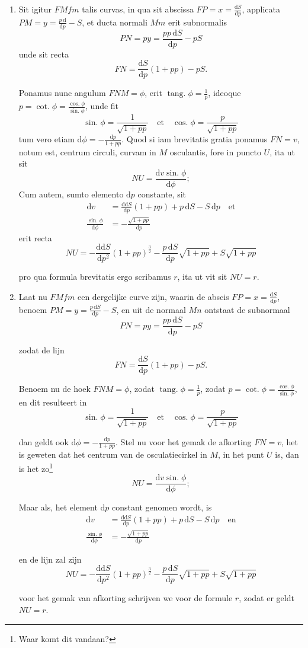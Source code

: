 \documentclass[10pt,a4paper]{article}
\newcommand{\switchenum}{\setcounter{enumi}{\arabic{enumi}-1}\switchcolumn}
\DeclareMathOperator{\tang}{tang.}
\DeclareMathOperator{\cotg}{cot.}
\DeclareMathOperator{\sing}{sin.}
\DeclareMathOperator{\cosg}{cos.}
\def\D{\mathrm{d}}
\begin{document}
\begin{paracol}{2}
\begin{enumerate}[topsep=1px]
		\switchcolumn*
		
		\item Sit igitur $FMfm$ talis curvas, in qua sit abscissa $FP=x=\frac{\D S}{\D p}$, applicata $PM=y=\frac{p\,\D }{\D p}-S$, et ducta normali $Mm$ erit subnormalis
		\[
			PN = py = \frac{pp\,\D S}{\D p}-pS
		\]
		unde sit recta
		\[
			FN = \frac{\D S}{\D p}(1+pp)-pS.
		\]
		\par Ponamus nunc angulum $FNM = \phi$, erit $\tang \phi = \frac{1}{p}$, ideoque $p=\cotg \phi = \frac{\cosg \phi}{\sing \phi}$, unde fit
		\[
			\sing \phi = \frac{1}{\sqrt{1+pp}} \quad \text{et} \quad \cosg \phi = \frac{p}{\sqrt{1+pp}}
		\]
		tum vero etiam $\D \phi = -\frac{\D p}{1+pp}$. Quod si iam brevitatis gratia ponamus $FN=v$, notum est, centrum circuli, curvam in $M$ osculantis, fore in puncto $U$, ita ut sit
		\[
			NU = \frac{\D v\sing \phi}{\D \phi};
		\]
		Cum autem, sumto elemento $\D p$ constante, sit
		\begin{align*}
			\D  v &= \frac{\D \D  S}{\D p}(1+pp)+p\,\D S-S\,\D p \quad \text{et}\\
			\frac{\sing \phi}{\D \phi} &= -\frac{\sqrt{1+pp}}{\D p}
		\end{align*}
		erit recta
		\[
			NU = -\frac{\D\D S}{\D p^2} (1+pp)^{\frac{3}{2}}-\frac{p\,\D S}{\D p} \sqrt{1+pp} + S\sqrt{1+pp}
		\]
		\par pro qua formula brevitatis ergo scribamus $r$, ita ut vit sit $NU=r$.
		
		\switchenum
		\item Laat nu $FMfm$ een dergelijke curve zijn, waarin de abscis $FP=x=\frac{\D S}{\D p}$, benoem $PM=y=\frac{p\, \D S}{\D p}-S$, en uit de normaal $Mn$ ontstaat de subnormaal
		\[
			PN = py = \frac{pp\,\D S}{\D p}-pS
		\]
		\par zodat de lijn
		\[
			FN = \frac{\D S}{\D p}(1+pp)-pS.
		\]
		\par Benoem nu de hoek $FNM = \phi$, zodat $\tang \phi = \frac{1}{p}$, zodat $p = \cotg \phi = \frac{\cosg \phi}{\sing \phi}$, en dit resulteert in
		\[
			\sing \phi = \frac{1}{\sqrt{1+pp}} \quad \text{et} \quad \cosg \phi = \frac{p}{\sqrt{1+pp}}
		\]
		\par dan geldt ook $\D \phi = -\frac{\D p}{1+pp}$. Stel nu voor het gemak de afkorting $FN=v$, het is geweten dat het centrum van de osculatiecirkel in $M$, in het punt $U$ is, dan is het zo\footnote{Waar komt dit vandaan?}
		\[
			NU = \frac{\D v\sing \phi}{\D \phi};
		\]
		\par Maar als, het element $\D p$ constant genomen wordt, is
		\begin{align*}
			\D  v &= \frac{\D \D  S}{\D p}(1+pp)+p\,\D S-S\,\D p \quad \text{en}\\
			\frac{\sing \phi}{\D \phi} &= -\frac{\sqrt{1+pp}}{\D p}
		\end{align*}
		\par en de lijn zal zijn
		\[
			NU = -\frac{\D\D S}{\D p^2} (1+pp)^{\frac{3}{2}}-\frac{p\,\D S}{\D p} \sqrt{1+pp} + S\sqrt{1+pp}
		\]
		\par voor het gemak van afkorting schrijven we voor de formule $r$, zodat er geldt $NU=r$.


\end{enumerate}
\end{paracol}
\end{document}
